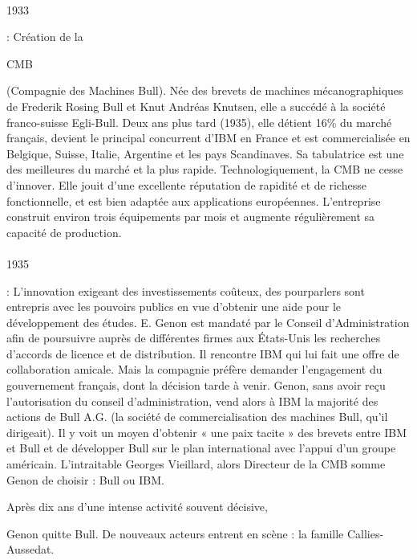 \documentclass[11pt]{article}
\begin{document}
		\paragraph{}
		\begin{bf}1933\end{bf}: Création de la \begin{bf}CMB\end{bf} (Compagnie des Machines Bull). Née des brevets de machines 
		mécanographiques de Frederik Rosing Bull et Knut Andréas Knutsen, elle a succédé à la société franco-suisse Egli-Bull. 
		Deux ans plus tard (1935), elle détient 16\% du marché français, devient le principal concurrent d'IBM en France et 
		est commercialisée en Belgique, Suisse, Italie, Argentine et les pays Scandinaves. Sa tabulatrice est une des 
		meilleures du marché et la plus rapide. Technologiquement, la CMB ne cesse d’innover. Elle jouit d’une excellente 
		réputation de rapidité et de richesse fonctionnelle, et est bien adaptée aux applications européennes. L’entreprise 
		construit environ trois équipements par mois et augmente régulièrement sa capacité de production.
		\paragraph{}
		\begin{bf}1935\end{bf}: L'innovation exigeant des investissements coûteux, des pourparlers sont entrepris avec les 
		pouvoirs publics en vue d'obtenir une aide pour le développement des études. E. Genon est mandaté par le Conseil 
		d'Administration afin de poursuivre auprès de différentes firmes aux États-Unis les recherches d'accords de licence et 
		de distribution. Il rencontre IBM qui lui fait une offre de collaboration amicale. Mais la compagnie préfère demander 
		l'engagement du gouvernement français, dont la décision tarde à venir. Genon, sans avoir reçu l'autorisation du conseil 
		d'administration, vend alors à IBM la majorité des actions de Bull A.G. (la société de commercialisation des machines 
		Bull, qu'il dirigeait). Il y voit un moyen d'obtenir « une paix tacite » des brevets entre IBM et Bull et de 
		développer Bull sur le plan international avec l'appui d'un groupe américain. L'intraitable Georges Vieillard, alors 
		Directeur de la CMB somme Genon de choisir : Bull ou IBM. \begin{bf}Après dix ans d'une intense activité souvent décisive,\end{bf} 
		Genon quitte Bull. De nouveaux acteurs entrent en scène : la famille Callies-Aussedat.
\end{document}
